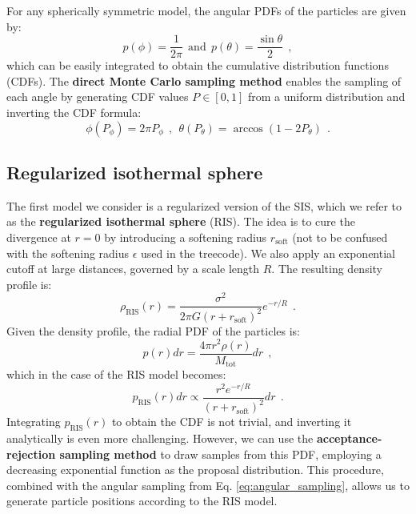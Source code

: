 \documentclass[fleqn,usenatbib]{mnras}
\begin{document}
For any spherically symmetric model, the angular PDFs of the particles are given by:
\begin{equation}
    p(\phi) = \dfrac{1}{2 \pi} \:\: \text{and} \:\: p(\theta) = \dfrac{\sin \theta}{2}  \:\: ,
    \label{eq:angular_pdf}
\end{equation}
which can be easily integrated to obtain the cumulative distribution functions (CDFs).
The \textbf{direct Monte Carlo sampling method} enables the sampling of each angle by generating CDF values $P \in [0,1]$ from a uniform distribution and inverting the CDF formula:
\begin{equation}
    \phi(P_\phi) = 2 \pi P_\phi \:\: , \:\: \theta(P_\theta) = \arccos\left(1 - 2 P_\theta\right) \:\: .
    \label{eq:angular_sampling}
\end{equation}

\subsection{Regularized isothermal sphere}\label{sec:isothermal_sphere}
The first model we consider is a regularized version of the SIS, which we refer to as the \textbf{regularized isothermal sphere} (RIS).
The idea is to cure the divergence at $r=0$ by introducing a softening radius $r_\text{soft}$ (not to be confused with the softening radius $\epsilon$ used in the treecode).
We also apply an exponential cutoff at large distances, governed by a scale length $R$.
The resulting density profile is:
\begin{equation}
    \rho_\text{RIS}(r) = \dfrac{\sigma^2}{2 \pi G \left(r + r_\text{soft}\right)^2} e^{-r/R} \:\: .
    \label{eq:ris_density}
\end{equation}
Given the density profile, the radial PDF of the particles is:
\begin{equation}
    p(r)dr = \dfrac{4\pi r^2 \rho(r)}{M_\text{tot}} dr\:\: ,
    \label{eq:radial_pdf}
\end{equation}
which in the case of the RIS model becomes:
\begin{equation}
    p_\text{RIS}(r)dr \propto \dfrac{r^2 e^{-r/R}}{\left(r + r_\text{soft}\right)^2} dr\:\: .
    \label{eq:ris_pdf}
\end{equation}
Integrating $p_\text{RIS}(r)$ to obtain the CDF is not trivial, and inverting it analytically is even more challenging.
However, we can use the \textbf{acceptance-rejection sampling method} to draw samples from this PDF, employing a decreasing exponential function as the proposal distribution.
This procedure, combined with the angular sampling from Eq. \ref{eq:angular_sampling}, allows us to generate particle positions according to the RIS model.
\vspace{0.5em}
\end{document}
